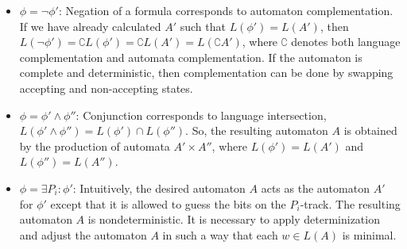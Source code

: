 \documentclass[pdflatex,sn-mathphys-num]{sn-jnl}%
\theoremstyle{thmstyleone}%
\theoremstyle{thmstyletwo}%
\theoremstyle{thmstylethree}%
\begin{document}
\begin{itemize}
\begin{figure}[H]
                    \end{figure}
                \item $\phi = \neg \phi'$: Negation of a formula corresponds to automaton complementation. If we have already calculated $A'$ such that $L(\phi') = L(A')$, then $L(\neg \phi') = \complement L(\phi') = \complement L(A') = L(\complement A')$, where $\complement$ denotes both language complementation and automata complementation. If the automaton is complete and deterministic, then complementation can be done by swapping accepting and non-accepting states.
                \vspace*{0.5em}
                \item $\phi = \phi' \land \phi''$: Conjunction corresponds to language intersection, $L(\phi' \land \phi'') = L(\phi') \cap L(\phi'')$. So, the resulting automaton $A$ is obtained by the production of automata $A' \times A''$, where $L(\phi') = L(A')$ and $L(\phi'') = L(A'')$.
                \vspace*{0.5em}
                \item $\phi = \exists P_i : \phi'$:  Intuitively, the desired automaton $A$ acts as the automaton $A'$ for $\phi'$ except that it is allowed to guess the bits on the $P_i$-track. The resulting automaton $A$ is nondeterministic. It is necessary to apply determinization and adjust the automaton $A$ in such a way that each $w \in L(A)$ is minimal.
            \end{itemize}
\end{document}
